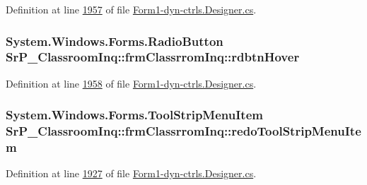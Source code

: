 \-Definition at line \hyperlink{_form1-dyn-ctrls_8_designer_8cs_source_l01957}{1957} of file \hyperlink{_form1-dyn-ctrls_8_designer_8cs_source}{\-Form1-\/dyn-\/ctrls.\-Designer.\-cs}.

\hypertarget{class_sr_p___classroom_inq_1_1frm_classrrom_inq_a2bee4d450744662c189d99c17658dac7}{
\subsubsection[{rdbtn\-Hover}]{\setlength{\rightskip}{0pt plus 5cm}\-System.\-Windows.\-Forms.\-Radio\-Button {\bf \-Sr\-P\-\_\-\-Classroom\-Inq\-::frm\-Classrrom\-Inq\-::rdbtn\-Hover}}}
\label{class_sr_p___classroom_inq_1_1frm_classrrom_inq_a2bee4d450744662c189d99c17658dac7}


\-Definition at line \hyperlink{_form1-dyn-ctrls_8_designer_8cs_source_l01958}{1958} of file \hyperlink{_form1-dyn-ctrls_8_designer_8cs_source}{\-Form1-\/dyn-\/ctrls.\-Designer.\-cs}.

\hypertarget{class_sr_p___classroom_inq_1_1frm_classrrom_inq_a1b4d7ae0d344dc1fda1561a1d652fa6c}{
\subsubsection[{redo\-Tool\-Strip\-Menu\-Item}]{\setlength{\rightskip}{0pt plus 5cm}\-System.\-Windows.\-Forms.\-Tool\-Strip\-Menu\-Item {\bf \-Sr\-P\-\_\-\-Classroom\-Inq\-::frm\-Classrrom\-Inq\-::redo\-Tool\-Strip\-Menu\-Item}}}
\label{class_sr_p___classroom_inq_1_1frm_classrrom_inq_a1b4d7ae0d344dc1fda1561a1d652fa6c}


\-Definition at line \hyperlink{_form1-dyn-ctrls_8_designer_8cs_source_l01927}{1927} of file \hyperlink{_form1-dyn-ctrls_8_designer_8cs_source}{\-Form1-\/dyn-\/ctrls.\-Designer.\-cs}.

